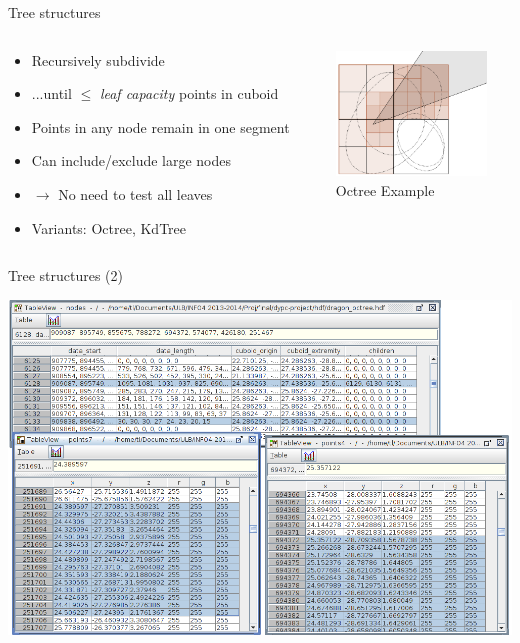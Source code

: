 \documentclass{beamer}
\begin{document}
\begin{frame}{Tree structures}
	\begin{columns}[c]
	\begin{column}[T]{.6\textwidth}
		\begin{itemize}
		\item Recursively subdivide
		\item ...until $\leq$ \emph{leaf capacity} points in cuboid
		\item Points in any node remain in one segment
		\item Can include/exclude large nodes
		\item $\rightarrow$ No need to test all leaves
		\item Variants: Octree, KdTree
		\end{itemize}
	\end{column}
	\begin{column}[T]{.4\textwidth}
		\includegraphics[width=4cm]{octree.png} \\
		Octree Example
	\end{column}
	\end{columns}
\end{frame}

\begin{frame}{Tree structures (2)}
	\begin{center}
	\includegraphics[width=\textwidth]{tree_hdf.png} \\
	\end{center}
\end{frame}
\end{document}

